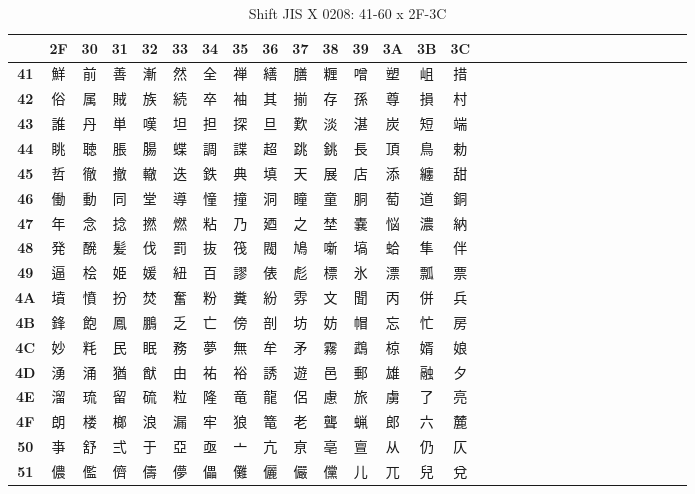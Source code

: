 \begin{table}[H]
\centering
\caption{Shift JIS X 0208: 41-60 x 2F-3C}
\begin{tabular}{|Sc|Sc|Sc|Sc|Sc|Sc|Sc|Sc|Sc|Sc|Sc|Sc|Sc|Sc|Sc|}
\hline
 & \textbf{2F} & \textbf{30} & \textbf{31} & \textbf{32} & \textbf{33} & \textbf{34} & \textbf{35} & \textbf{36} & \textbf{37} & \textbf{38} & \textbf{39} & \textbf{3A} & \textbf{3B} & \textbf{3C} \\ \hline
\textbf{41} & 鮮 & 前 & 善 & 漸 & 然 & 全 & 禅 & 繕 & 膳 & 糎 & 噌 & 塑 & 岨 & 措 \\ \hline
\textbf{42} & 俗 & 属 & 賊 & 族 & 続 & 卒 & 袖 & 其 & 揃 & 存 & 孫 & 尊 & 損 & 村 \\ \hline
\textbf{43} & 誰 & 丹 & 単 & 嘆 & 坦 & 担 & 探 & 旦 & 歎 & 淡 & 湛 & 炭 & 短 & 端 \\ \hline
\textbf{44} & 眺 & 聴 & 脹 & 腸 & 蝶 & 調 & 諜 & 超 & 跳 & 銚 & 長 & 頂 & 鳥 & 勅 \\ \hline
\textbf{45} & 哲 & 徹 & 撤 & 轍 & 迭 & 鉄 & 典 & 填 & 天 & 展 & 店 & 添 & 纏 & 甜 \\ \hline
\textbf{46} & 働 & 動 & 同 & 堂 & 導 & 憧 & 撞 & 洞 & 瞳 & 童 & 胴 & 萄 & 道 & 銅 \\ \hline
\textbf{47} & 年 & 念 & 捻 & 撚 & 燃 & 粘 & 乃 & 廼 & 之 & 埜 & 嚢 & 悩 & 濃 & 納 \\ \hline
\textbf{48} & 発 & 醗 & 髪 & 伐 & 罰 & 抜 & 筏 & 閥 & 鳩 & 噺 & 塙 & 蛤 & 隼 & 伴 \\ \hline
\textbf{49} & 逼 & 桧 & 姫 & 媛 & 紐 & 百 & 謬 & 俵 & 彪 & 標 & 氷 & 漂 & 瓢 & 票 \\ \hline
\textbf{4A} & 墳 & 憤 & 扮 & 焚 & 奮 & 粉 & 糞 & 紛 & 雰 & 文 & 聞 & 丙 & 併 & 兵 \\ \hline
\textbf{4B} & 鋒 & 飽 & 鳳 & 鵬 & 乏 & 亡 & 傍 & 剖 & 坊 & 妨 & 帽 & 忘 & 忙 & 房 \\ \hline
\textbf{4C} & 妙 & 粍 & 民 & 眠 & 務 & 夢 & 無 & 牟 & 矛 & 霧 & 鵡 & 椋 & 婿 & 娘 \\ \hline
\textbf{4D} & 湧 & 涌 & 猶 & 猷 & 由 & 祐 & 裕 & 誘 & 遊 & 邑 & 郵 & 雄 & 融 & 夕 \\ \hline
\textbf{4E} & 溜 & 琉 & 留 & 硫 & 粒 & 隆 & 竜 & 龍 & 侶 & 慮 & 旅 & 虜 & 了 & 亮 \\ \hline
\textbf{4F} & 朗 & 楼 & 榔 & 浪 & 漏 & 牢 & 狼 & 篭 & 老 & 聾 & 蝋 & 郎 & 六 & 麓 \\ \hline
\textbf{50} & 亊 & 舒 & 弍 & 于 & 亞 & 亟 & 亠 & 亢 & 亰 & 亳 & 亶 & 从 & 仍 & 仄 \\ \hline
\textbf{51} & 儂 & 儖 & 儕 & 儔 & 儚 & 儡 & 儺 & 儷 & 儼 & 儻 & 儿 & 兀 & 兒 & 兌 \\ \hline

\end{tabular}
\end{table}
